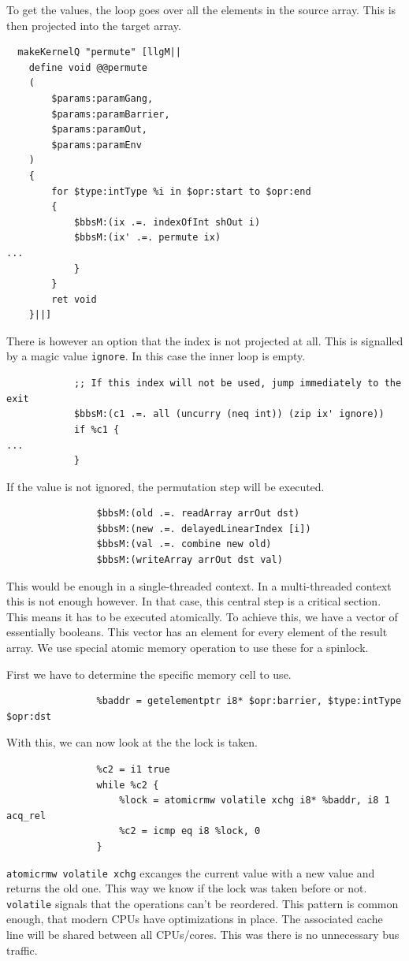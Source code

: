 \documentclass[a4paper,bibliography=totocnumbered,parskip,headsepline]{scrbook}
\begin{document}
To get the values, the loop goes over all the elements in the source array.
This is then projected into the target array.
\begin{lstlisting}
  makeKernelQ "permute" [llgM||
    define void @@permute
    (
        $params:paramGang,
        $params:paramBarrier,
        $params:paramOut,
        $params:paramEnv
    )
    {
        for $type:intType %i in $opr:start to $opr:end
        {
            $bbsM:(ix .=. indexOfInt shOut i)
            $bbsM:(ix' .=. permute ix)
...
            }
        }
        ret void
    }||]
\end{lstlisting}
There is however an option that the index is not projected at all.
This is signalled by a magic value \lstinline[language=haskell]!ignore!.
In this case the inner loop is empty.
\begin{lstlisting}
            ;; If this index will not be used, jump immediately to the exit
            $bbsM:(c1 .=. all (uncurry (neq int)) (zip ix' ignore))
            if %c1 {
...
            }
\end{lstlisting}
If the value is not ignored, the permutation step will be executed.
\begin{lstlisting}
                $bbsM:(old .=. readArray arrOut dst)
                $bbsM:(new .=. delayedLinearIndex [i])
                $bbsM:(val .=. combine new old)
                $bbsM:(writeArray arrOut dst val)
\end{lstlisting}
This would be enough in a single-threaded context.
In a multi-threaded context this is not enough however.
In that case, this central step is a critical section.
This means it has to be executed atomically.
To achieve this, we have a vector of essentially booleans.
This vector has an element for every element of the result array.
We use special atomic memory operation to use these for a spinlock.

First we have to determine the specific memory cell to use.
\begin{lstlisting}
                %baddr = getelementptr i8* $opr:barrier, $type:intType $opr:dst
\end{lstlisting}
With this, we can now look at the the lock is taken.
\begin{lstlisting}
                %c2 = i1 true
                while %c2 {
                    %lock = atomicrmw volatile xchg i8* %baddr, i8 1 acq_rel
                    %c2 = icmp eq i8 %lock, 0
                }
\end{lstlisting}
\lstinline!atomicrmw volatile xchg! excanges the current value with a new value and returns the old one.
This way we know if the lock was taken before or not.
\lstinline!volatile! signals that the operations can't be reordered.
This pattern is common enough, that modern CPUs have optimizations in place.
The associated cache line will be shared between all CPUs/cores.
This was there is no unnecessary bus traffic.
\end{document}
